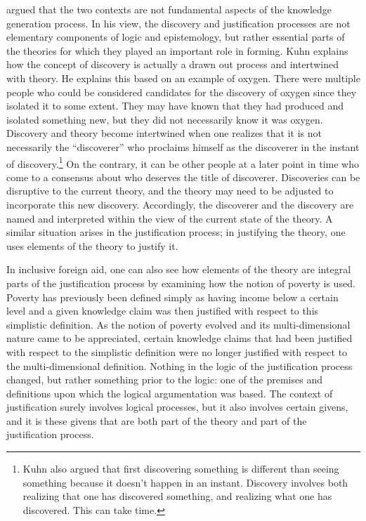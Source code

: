 \documentclass[a4paper]{article}
\begin{document}
\cite{kuhn1970structure} argued that the two contexts are not fundamental
aspects of the knowledge generation process. In his view, the discovery and
justification processes are not elementary components of logic and
epistemology, but rather essential parts of the theories for which they played
an important role in forming. Kuhn explains how the concept of discovery is
actually a drawn out process and intertwined with theory. He explains this
based on an example of oxygen. There were multiple people who could be
considered candidates for the discovery of oxygen since they isolated it to
some extent. They may have known that they had produced and isolated something
new, but they did not necessarily know it was oxygen. Discovery and theory
become intertwined when one realizes that it is not necessarily the
``discoverer'' who proclaims himself as the discoverer in the instant of
discovery.\footnote{Kuhn also argued that first discovering something is
different than seeing something because it doesn't happen in an instant.
Discovery involves both realizing that one has discovered something, and
realizing what one has discovered. This can take time.} On the contrary, it
can be other people at a later point in time who come to a consensus about who
deserves the title of discoverer. Discoveries can be disruptive to the current
theory, and the theory may need to be adjusted to incorporate this new
discovery. Accordingly, the discoverer and the discovery are named and
interpreted within the view of the current state of the theory. A similar
situation arises in the justification process; in justifying the theory, one
uses elements of the theory to justify it.

In inclusive foreign aid, one can also see how elements of the theory are
integral parts of the justification process by examining how the notion of
poverty is used. Poverty has previously been defined simply as having income
below a certain level and a given knowledge claim was then justified with
respect to this simplistic definition. As the notion of poverty evolved and
its multi-dimensional nature came to be appreciated, certain knowledge claims
that had been justified with respect to the simplistic definition were no
longer justified with respect to the multi-dimensional definition. Nothing in
the logic of the justification process changed, but rather something prior to
the logic: one of the premises and definitions upon which the logical
argumentation was based. The context of justification surely involves logical
processes, but it also involves certain givens, and it is these givens that
are both part of the theory and part of the justification process.
\end{document}
